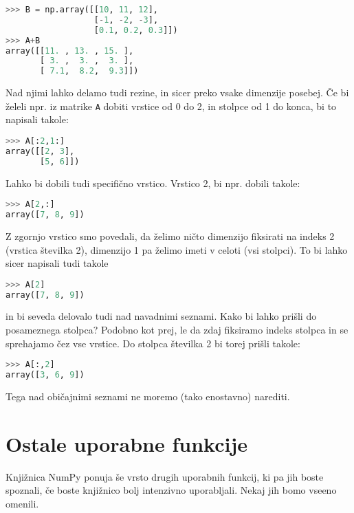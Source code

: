 \begin{lstlisting}[language=Python]
>>> B = np.array([[10, 11, 12], 
                  [-1, -2, -3], 
                  [0.1, 0.2, 0.3]])
>>> A+B
array([[11. , 13. , 15. ],
       [ 3. ,  3. ,  3. ],
       [ 7.1,  8.2,  9.3]])
\end{lstlisting}
Nad njimi lahko delamo tudi rezine, in sicer preko vsake dimenzije posebej. Če bi želeli npr. iz matrike \texttt{A} dobiti vrstice od 0 do 2, in stolpce od 1 do konca, bi to napisali takole:
\begin{lstlisting}[language=Python]
>>> A[:2,1:]
array([[2, 3],
       [5, 6]])
\end{lstlisting}
Lahko bi dobili tudi specifično vrstico. Vrstico 2, bi npr. dobili takole:
\begin{lstlisting}[language=Python]
>>> A[2,:]
array([7, 8, 9])
\end{lstlisting}
Z zgornjo vrstico smo povedali, da želimo ničto dimenzijo fiksirati na indeks 2 (vrstica številka 2), dimenzijo 1 pa želimo imeti v celoti (vsi stolpci). To bi lahko sicer napisali tudi takole
\begin{lstlisting}[language=Python]
>>> A[2]
array([7, 8, 9])
\end{lstlisting}
in bi seveda delovalo tudi nad navadnimi seznami. Kako bi lahko prišli do posameznega stolpca? Podobno kot prej, le da zdaj fiksiramo indeks stolpca in se sprehajamo čez vse vrstice. Do stolpca številka 2 bi torej prišli takole:
\begin{lstlisting}[language=Python]
>>> A[:,2]
array([3, 6, 9])
\end{lstlisting}
Tega nad običajnimi seznami ne moremo (tako enostavno) narediti.

\section{Ostale uporabne funkcije}
Knjižnica NumPy ponuja še vrsto drugih uporabnih funkcij, ki pa jih boste spoznali, če boste knjižnico bolj intenzivno uporabljali. Nekaj jih bomo vseeno omenili.

